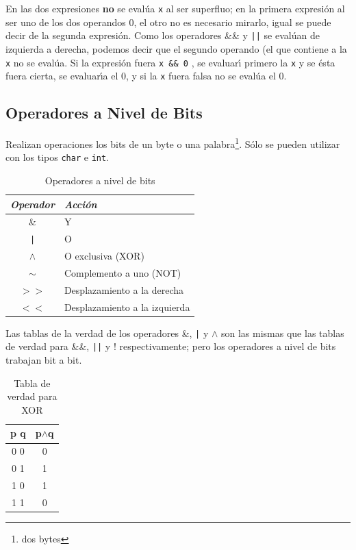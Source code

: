 En las dos expresiones \textbf{no} se eval\'ua \texttt{x} al ser superfluo; en 
la primera expresi\'on al ser uno de los dos operandos 0, el otro no es 
necesario mirarlo, igual se puede decir de la segunda expresi\'on. Como los 
operadores \&\& y \texttt{||} se eval\'uan de izquierda a derecha, podemos 
decir que el segundo operando (el que contiene a la \texttt{x} no se eval\'ua.
Si la expresi\'on fuera \texttt{x \&\& 0} , se evaluar\'{\i} primero la 
\texttt{x} y se \'esta fuera cierta, se evaluar\'{\i}a el 0, y si la 
\texttt{x} fuera falsa no se eval\'ua el 0.

\subsection{Operadores a Nivel de Bits}


Realizan operaciones los bits de un byte o una palabra\footnote{dos bytes}. 
S\'olo se pueden utilizar con los tipos \texttt{char} e \texttt{int}.

\begin{table}[!hbp]
\begin{tabular}{|c|l|}\hline
\em Operador & \em Acci\'on\\\hline
\hline
\& & Y\\\hline
\texttt{|} & O\\\hline
$\land$ & O exclusiva (XOR)\\\hline
$\sim$ & Complemento a uno (NOT)\\\hline
$>>$ & Desplazamiento a la derecha\\\hline
$<<$ & Desplazamiento a la izquierda\\\hline
\end{tabular}
\caption{Operadores a nivel de bits}
\end{table}

Las tablas de la verdad de los operadores \&, \texttt{|} y $\land$ son las 
mismas que las tablas de verdad para \&\&, \texttt{||} y ! respectivamente;
pero los operadores a nivel de bits trabajan bit a bit.

\begin{table}[!hbp]
\begin{tabular}{|c|c|}\hline
p q & p$\land$q\\\hline
\hline
0 0 & 0\\\hline
0 1 & 1\\\hline
1 0 & 1\\\hline
1 1 & 0\\\hline

\end{tabular}
\caption{Tabla de verdad para XOR}
\end{table}

